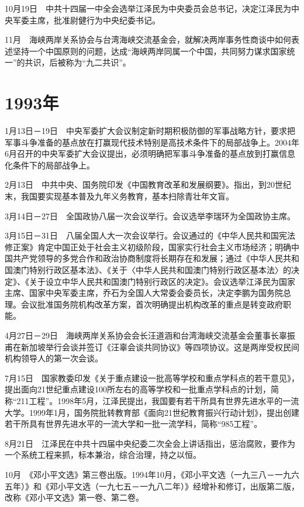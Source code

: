 \documentclass[10pt,a4paper,twocolumn]{book}
\begin{document}
10月19日　中共十四届一中全会选举江泽民为中央委员会总书记，决定江泽民为中央军委主席，批准尉健行为中央纪委书记。

11月　海峡两岸关系协会与台湾海峡交流基金会，就解决两岸事务性商谈中如何表述坚持一个中国原则的问题，达成“海峡两岸同属一个中国，共同努力谋求国家统一”的共识，后被称为“九二共识”。

\section{1993年}

1月13日－19日　中央军委扩大会议制定新时期积极防御的军事战略方针，要求把军事斗争准备的基点放在打赢现代技术特别是高技术条件下的局部战争上。2004年6月召开的中央军委扩大会议提出，必须明确把军事斗争准备的基点放到打赢信息化条件下的局部战争上。

2月13日　中共中央、国务院印发《中国教育改革和发展纲要》。指出，到20世纪末，我国要实现基本普及九年义务教育，基本扫除青壮年文盲。

3月14日－27日　全国政协八届一次会议举行。会议选举李瑞环为全国政协主席。

3月15日－31日　八届全国人大一次会议举行。会议通过的《中华人民共和国宪法修正案》肯定中国正处于社会主义初级阶段，国家实行社会主义市场经济；明确中国共产党领导的多党合作和政治协商制度将长期存在和发展；通过《中华人民共和国澳门特别行政区基本法》、《关于〈中华人民共和国澳门特别行政区基本法〉的决定》、《关于设立中华人民共和国澳门特别行政区的决定》。会议选举江泽民为国家主席、国家中央军委主席，乔石为全国人大常委会委员长，决定李鹏为国务院总理。会议批准国务院机构改革方案，首次明确提出机构改革的重点是转变政府职能。

4月27日－29日　海峡两岸关系协会会长汪道涵和台湾海峡交流基金会董事长辜振甫在新加坡举行会谈并签订《汪辜会谈共同协议》等四项协议。这是两岸受权民间机构领导人的第一次会谈。

7月15日　国家教委印发《关于重点建设一批高等学校和重点学科点的若干意见》，提出面向21世纪重点建设100所左右的高等学校和一批重点学科点的计划，简称“211工程”。1998年5月，江泽民提出，我国要有若干所具有世界先进水平的一流大学。1999年1月，国务院批转教育部《面向21世纪教育振兴行动计划》，提出创建若干所具有世界先进水平的一流大学和一批一流学科，简称“985工程”。

8月21日　江泽民在中共十四届中央纪委二次全会上讲话指出，惩治腐败，要作为一个系统工程来抓，标本兼治，综合治理，持之以恒。

10月　《邓小平文选》第三卷出版。1994年10月，《邓小平文选（一九三八－一九六五年）》和《邓小平文选（一九七五－一九八二年）》经增补和修订，出版第二版，改称《邓小平文选》第一卷、第二卷。
\end{document}
